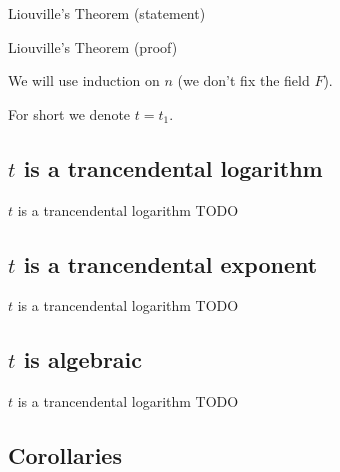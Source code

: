\documentclass[8pt]{beamer}
\renewcommand{\|}{\ensuremath{\hspace{0.1cm} | \hspace{0.1cm}}}
\begin{document}
\begin{section}{Liouville's Theorem (statement)}
\begin{frame}{Liouville's Theorem (proof)}
{            We will use induction on $n$ (we don't fix the field $F$).

            For short we denote $t = t_1$.
        }


    \end{frame}

    \subsection{$t$ is a trancendental logarithm}
    \begin{frame}{$t$ is a trancendental logarithm}
        TODO
    \end{frame}

    \subsection{$t$ is a trancendental exponent}
    \begin{frame}{$t$ is a trancendental logarithm}
        TODO
    \end{frame}

    \subsection{$t$ is algebraic}
    \begin{frame}{$t$ is a trancendental logarithm}
        TODO
    \end{frame}

    \section{Corollaries}

\end{section}
\end{document}
